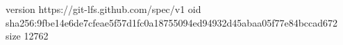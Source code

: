 version https://git-lfs.github.com/spec/v1
oid sha256:9fbe14e6de7cfeae5f57d1fc0a18755094ed94932d45abaa05f77e84bccad672
size 12762

